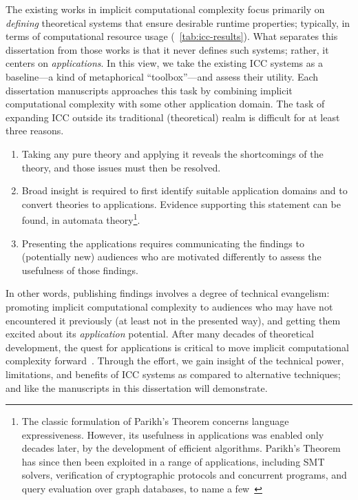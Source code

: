 The existing works in implicit computational complexity focus primarily on \emph{defining} theoretical systems that ensure desirable runtime properties;
typically, in terms of computational resource usage (\cf~\autoref{tab:icc-results}).
What separates this dissertation from those works is that it never defines such systems;
rather, it centers on \emph{applications}.
In this view, we take the existing ICC systems as a baseline---a kind of metaphorical \enquote{toolbox}---and assess their utility.
Each dissertation manuscripts approaches this task by combining implicit computational complexity with some other application domain.
The task of expanding ICC outside its traditional (theoretical) realm is difficult for at least three reasons.

\begin{enumerate}

\item Taking any pure theory and applying it reveals the shortcomings of the theory, and those issues must then be resolved.

\item Broad insight is required to first identify suitable application domains and to convert theories to applications.
Evidence supporting this statement can be found, \eg in automata theory\footnote{
The classic formulation of Parikh's Theorem concerns language expressiveness.
However, its usefulness in applications was enabled {only decades later}, by the development of efficient algorithms.
Parikh's Theorem has since then been exploited in a range of applications, including SMT solvers, verification of cryptographic protocols and concurrent programs, and query evaluation over graph databases, to name a few~\cite[pg. 2]{hague2024}}.

\item Presenting the applications requires communicating the findings to (potentially new) audiences who are motivated differently to assess the {usefulness} of those findings.
\end{enumerate}

In other words, publishing findings involves a degree of technical evangelism: promoting implicit computational complexity to audiences who may have not encountered it previously (at least not in the presented way), and getting them excited about its \emph{application} potential.
After many decades of theoretical development, the quest for applications is critical to move implicit computational complexity forward~\cite[p.~7]{moyen2017}.
Through the effort, we gain insight of the technical power, limitations, and benefits of ICC systems as compared to alternative techniques; and like the manuscripts in this dissertation will demonstrate.

